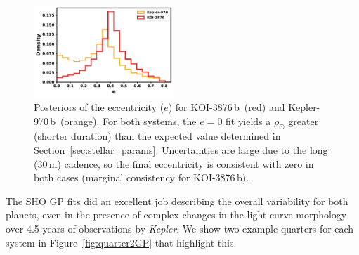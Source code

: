 \documentclass[twocolumn, linenumbers]{aastex631}
\newcommand{\planetname}{KOI-3876\,b}
\newcommand{\planetnametwo}{Kepler-970\,b}
\newcommand{\kepler}{{\it Kepler}}
\begin{document}
\begin{figure}[tbhp]
    \includegraphics[width=0.47\textwidth]{eccPosterior.pdf}
    \caption{Posteriors of the eccentricity ($e$) for \planetname\ (red) and \planetnametwo\ (orange). For both systems, the $e=0$ fit yields a $\rho_\odot$ greater (shorter duration) than the expected value determined in Section~\ref{sec:stellar_params}. Uncertainties are large due to the long (30\,m) cadence, so the final eccentricity is consistent with zero in both cases (marginal consistency for \planetname). }
    \label{fig:ecchist}
\end{figure}



The SHO GP fits did an excellent job describing the overall variability for both planets, even in the presence of complex changes in the light curve morphology over 4.5 years of observations by \kepler. We show two example quarters for each system in Figure~\ref{fig:quarter2GP} that highlight this.  
\end{document}
